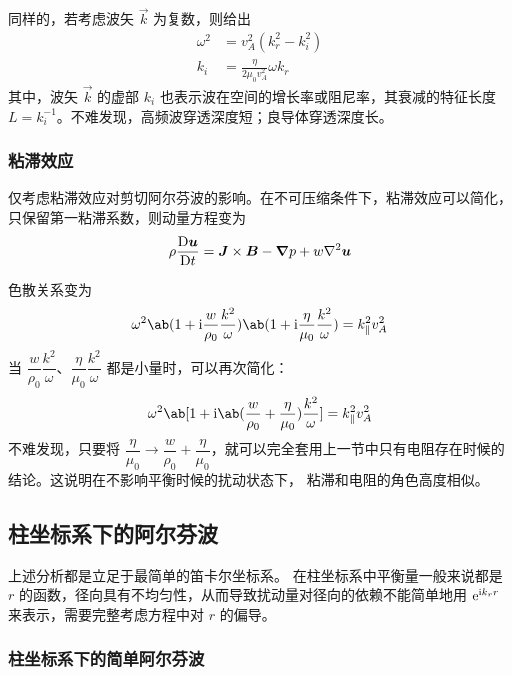 同样的，若考虑波矢 $\vec{k}$ 为复数，则给出
\begin{subequations}\begin{align}
\omega^2 &= v_A^2 (k_r^2 - k_i^2) \\
k_i &= \frac{\eta}{2 \mu_0 v_A^2} \omega k_r
\end{align}\end{subequations}
其中，波矢 $\vec{k}$ 的虚部 $k_i$ 也表示波在空间的增长率或阻尼率，其衰减的特征长度 $L = k_i^{-1}$。不难发现，高频波穿透深度短；良导体穿透深度长。

\subsubsection{粘滞效应}

仅考虑粘滞效应对剪切阿尔芬波的影响。在不可压缩条件下，粘滞效应可以简化，只保留第一粘滞系数，则动量方程变为
\begin{equation}
\rho \mdv{\vec{u}}{t} = \vec{J} \times \vec{B} - \grad{p} + w \laplacian{\vec{u}}
\end{equation}

色散关系变为
\begin{equation}
\omega^2 \ab(1 + \im \frac{w}{\rho_0} \frac{k^2}{\omega})
\ab(1 + \im \frac{\eta}{\mu_0} \frac{k^2}{\omega}) = k_\parallel^2 v_A^2
\end{equation}
当 $\dfrac{w}{\rho_0} \dfrac{k^2}{\omega}$、$\dfrac{\eta}{\mu_0} \dfrac{k^2}{\omega}$ 都是小量时，可以再次简化：
\begin{equation}
\omega^2 \ab[1 + \im \ab(\frac{w}{\rho_0} + \frac{\eta}{\mu_0}) \frac{k^2}{\omega}] = k_\parallel^2 v_A^2
\end{equation}
不难发现，只要将 $\dfrac{\eta}{\mu_0} \rightarrow \dfrac{w}{\rho_0} + \dfrac{\eta}{\mu_0}$，就可以完全套用上一节中只有电阻存在时候的结论。这说明在不影响平衡时候的扰动状态下，
粘滞和电阻的角色高度相似。

\subsection{柱坐标系下的阿尔芬波}

上述分析都是立足于最简单的笛卡尔坐标系。
在柱坐标系中平衡量一般来说都是 $r$ 的函数，径向具有不均匀性，从而导致扰动量对径向的依赖不能简单地用 $\mathrm{e}^{\mathrm{i} k_r r}$ 来表示，需要完整考虑方程中对 $r$ 的偏导。

\subsubsection{柱坐标系下的简单阿尔芬波}


